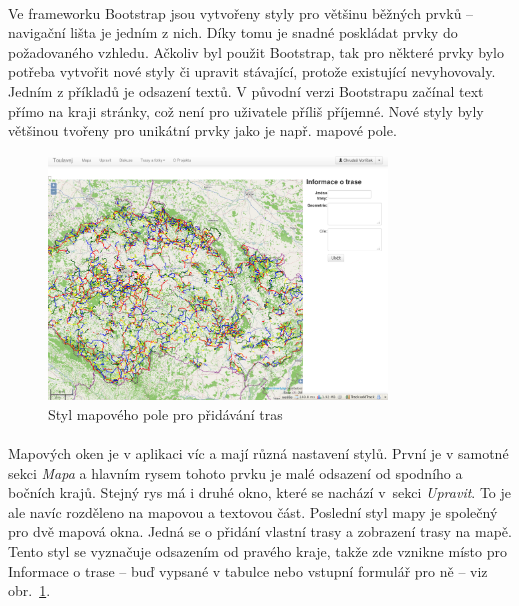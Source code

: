 \documentclass[11pt,a4paper,titlepage,oneside]{book}
\begin{document}
			\paragraph{} Ve frameworku Bootstrap jsou vytvořeny styly pro většinu běžných prvků -- navigační lišta je jedním z nich. Díky tomu je snadné poskládat prvky do požadovaného vzhledu. Ačkoliv byl použit Bootstrap, tak pro některé prvky bylo potřeba vytvořit nové styly či upravit stávající, protože existující nevyhovovaly. Jedním z příkladů je odsazení textů. V původní verzi Bootstrapu začínal text přímo na kraji stránky, což není pro uživatele příliš příjemné. Nové styly byly většinou tvořeny pro unikátní prvky jako je např. mapové pole.
		\begin{figure}[!h]
			\begin{center}
				\includegraphics[width=9cm]{obrazky/toulavej/addTrack.png}
				\caption{Styl mapového pole pro přidávání tras}
				\label{fig:addTrack}
			\end{center}
		\end{figure}	
			\paragraph{} Mapových oken je v aplikaci víc a mají různá nastavení stylů. První je v samotné sekci \textit{Mapa} a hlavním rysem tohoto prvku je malé odsazení od spodního a bočních krajů. Stejný rys má i druhé okno, které se nachází v~sekci \textit{Upravit}. To je ale navíc rozděleno na mapovou a textovou část. Poslední styl mapy je společný pro dvě mapová okna. Jedná se o přidání vlastní trasy a zobrazení trasy na mapě. Tento styl se vyznačuje odsazením od pravého kraje, takže zde vznikne místo pro Informace o trase -- buď vypsané v tabulce nebo vstupní formulář pro ně -- viz obr.~\ref{fig:addTrack}.
\end{document}
